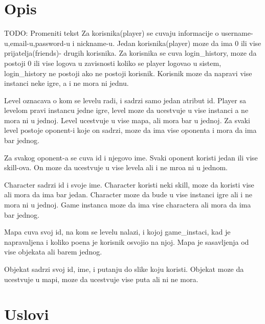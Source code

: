 \documentclass{article}
\begin{document}
\section {Opis}
TODO: Promeniti tekst
Za korisnika(player) se cuvaju informacije o username-u,email-u,password-u i nickname-u. Jedan korisnika(player) moze da ima 0 ili vise prijatelja(friends)- drugih korisnika.
Za korisnika se cuva login\_history, moze da postoji 0 ili vise logova u zavisnosti koliko se player logovao u sistem, login\_history ne postoji ako ne postoji korisnik.
Korisnik moze da napravi vise instanci neke igre, a i ne mora ni jednu.

Level oznacava o kom se levelu radi, i sadrzi samo jedan atribut id. Player sa levelom pravi instancu jedne igre, level moze da ucestvuje u vise instanci a ne mora ni u jednoj.
Level ucestvuje u vise mapa, ali mora bar u jednoj. Za svaki level postoje oponent-i koje on sadrzi, moze da ima vise oponenta i mora da ima bar jednog.

Za svakog oponent-a se cuva id i njegovo ime. Svaki oponent koristi jedan ili vise skill-ova. On moze da ucestvuje u vise levela ali i ne mroa ni u jednom.

Character sadrzi id i svoje ime. Character koristi neki skill, moze da koristi vise ali mora da ima bar jedan. Character moze da bude u vise instanci igre ali i ne mora ni u jednoj. Game instanca moze da ima vise charactera ali mora da ima bar jednog.

Mapa cuva svoj id, na kom se levelu nalazi, i kojoj game\_instaci, kad je napravaljena i koliko poena je korisnik osvojio na njoj. Mapa je sasavljenja od vise objekata ali barem jednog.

Objekat sadrzi svoj id, ime, i putanju do slike koju koristi. Objekat moze da ucestvuje u mapi, moze da ucestvuje vise puta ali ni ne mora.

\section {Uslovi}
\end{document}
